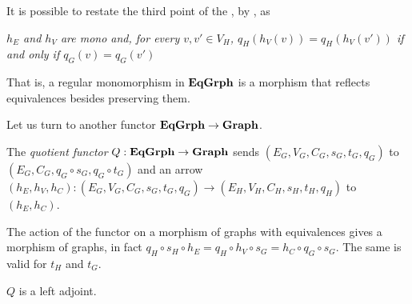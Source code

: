 \begin{remark}
    It is possible to restate the third point of the , by , as 
    \begin{displayquote}
    \textit{$h_E$ and $h_V$ are mono and, for every $v, v'\in V_H$, $q_H(h_V(v))=q_H(h_V(v'))$ if and only if $q_G(v)=q_G(v')$}
    \end{displayquote}
    That is, a regular monomorphism in $\mathbf{EqGrph}$ is a morphism that reflects equivalences besides preserving them.
\end{remark}

Let us turn to another functor $\mathbf{EqGrph}\to \mathbf{Graph}$.

\begin{definition}
The \emph{quotient functor} $Q:\mathbf{EqGrph}\to \mathbf{Graph} $ sends $(E_G, V_G, C_G, s_G, t_G, q_G)$ to $(E_G, C_G, q_G\circ s_G, q_G\circ t_G)$ and an arrow $(h_E, h_V, h_C) \colon (E_G, V_G, C_G, s_G, t_G, q_G)\to (E_H, V_H, C_H, s_H, t_H, q_H)$ to $(h_E, h_C)$.
\end{definition}

\begin{remark}
    The action of the functor on a morphism of graphs with equivalences gives a morphism of graphs, in fact $q_H \circ s_H \circ h_E = q_H \circ h_V \circ s_G = h_C \circ q_G \circ s_G$. The same is valid for $t_H$ and $t_G$. 
\end{remark}

\begin{lemma}\label{lemma:quot_funct_left_adj}
    $Q$ is a left adjoint.
\end{lemma}

